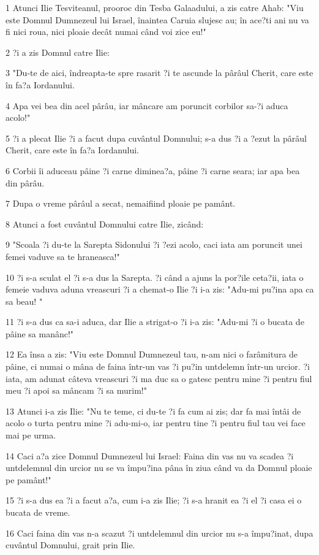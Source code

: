 \par 1 Atunci Ilie Tesviteanul, prooroc din Tesba Galaadului, a zis catre Ahab: "Viu este Domnul Dumnezeul lui Israel, înaintea Caruia slujesc au; în ace?ti ani nu va fi nici roua, nici ploaie decât numai când voi zice eu!"
\par 2 ?i a zis Domnul catre Ilie:
\par 3 "Du-te de aici, îndreapta-te spre rasarit ?i te ascunde la pârâul Cherit, care este în fa?a Iordanului.
\par 4 Apa vei bea din acel pârâu, iar mâncare am poruncit corbilor sa-?i aduca acolo!"
\par 5 ?i a plecat Ilie ?i a facut dupa cuvântul Domnului; s-a dus ?i a ?ezut la pârâul Cherit, care este în fa?a Iordanului.
\par 6 Corbii îi aduceau pâine ?i carne diminea?a, pâine ?i carne seara; iar apa bea din pârâu.
\par 7 Dupa o vreme pârâul a secat, nemaifiind ploaie pe pamânt.
\par 8 Atunci a fost cuvântul Domnului catre Ilie, zicând:
\par 9 "Scoala ?i du-te la Sarepta Sidonului ?i ?ezi acolo, caci iata am poruncit unei femei vaduve sa te hraneasca!"
\par 10 ?i s-a sculat el ?i s-a dus la Sarepta. ?i când a ajuns la por?ile ceta?ii, iata o femeie vaduva aduna vreascuri ?i a chemat-o Ilie ?i i-a zis: "Adu-mi pu?ina apa ca sa beau! "
\par 11 ?i s-a dus ca sa-i aduca, dar Ilie a strigat-o ?i i-a zis: "Adu-mi ?i o bucata de pâine sa manânc!"
\par 12 Ea însa a zis: "Viu este Domnul Dumnezeul tau, n-am nici o farâmitura de pâine, ci numai o mâna de faina într-un vas ?i pu?in untdelemn într-un urcior. ?i iata, am adunat câteva vreascuri ?i ma duc sa o gatesc pentru mine ?i pentru fiul meu ?i apoi sa mâncam ?i sa murim!"
\par 13 Atunci i-a zis Ilie: "Nu te teme, ci du-te ?i fa cum ai zis; dar fa mai întâi de acolo o turta pentru mine ?i adu-mi-o, iar pentru tine ?i pentru fiul tau vei face mai pe urma.
\par 14 Caci a?a zice Domnul Dumnezeul lui Israel: Faina din vas nu va scadea ?i untdelemnul din urcior nu se va împu?ina pâna în ziua când va da Domnul ploaie pe pamânt!"
\par 15 ?i s-a dus ea ?i a facut a?a, cum i-a zis Ilie; ?i s-a hranit ea ?i el ?i casa ei o bucata de vreme.
\par 16 Caci faina din vas n-a scazut ?i untdelemnul din urcior nu s-a împu?inat, dupa cuvântul Domnului, grait prin Ilie.
